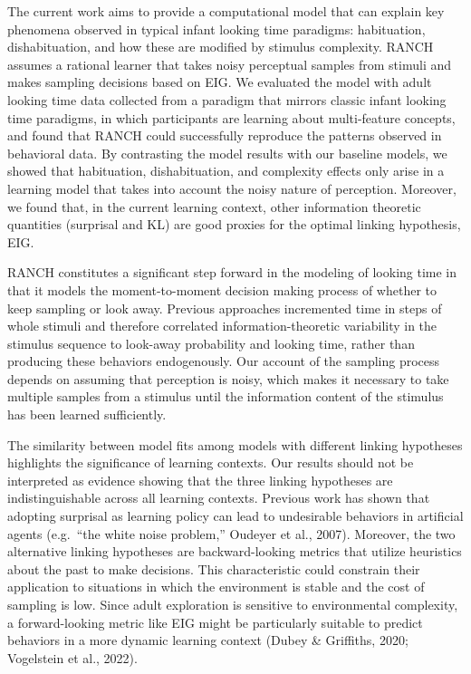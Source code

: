 \documentclass[10pt, letterpaper]{article}
\begin{document}
The current work aims to provide a computational model that can explain
key phenomena observed in typical infant looking time paradigms:
habituation, dishabituation, and how these are modified by stimulus
complexity. RANCH assumes a rational learner that takes noisy perceptual
samples from stimuli and makes sampling decisions based on EIG. We
evaluated the model with adult looking time data collected from a
paradigm that mirrors classic infant looking time paradigms, in which
participants are learning about multi-feature concepts, and found that
RANCH could successfully reproduce the patterns observed in behavioral
data. By contrasting the model results with our baseline models, we
showed that habituation, dishabituation, and complexity effects only
arise in a learning model that takes into account the noisy nature of
perception. Moreover, we found that, in the current learning context,
other information theoretic quantities (surprisal and KL) are good
proxies for the optimal linking hypothesis, EIG.

RANCH constitutes a significant step forward in the modeling of looking
time in that it models the moment-to-moment decision making process of
whether to keep sampling or look away. Previous approaches incremented
time in steps of whole stimuli and therefore correlated
information-theoretic variability in the stimulus sequence to look-away
probability and looking time, rather than producing these behaviors
endogenously. Our account of the sampling process depends on assuming
that perception is noisy, which makes it necessary to take multiple
samples from a stimulus until the information content of the stimulus
has been learned sufficiently.

The similarity between model fits among models with different linking
hypotheses highlights the significance of learning contexts. Our results
should not be interpreted as evidence showing that the three linking
hypotheses are indistinguishable across all learning contexts. Previous
work has shown that adopting surprisal as learning policy can lead to
undesirable behaviors in artificial agents (e.g.~{``the white noise
problem,''} Oudeyer et al., 2007). Moreover, the two alternative linking
hypotheses are backward-looking metrics that utilize heuristics about
the past to make decisions. This characteristic could constrain their
application to situations in which the environment is stable and the
cost of sampling is low. Since adult exploration is sensitive to
environmental complexity, a forward-looking metric like EIG might be
particularly suitable to predict behaviors in a more dynamic learning
context (Dubey \& Griffiths, 2020; Vogelstein et al., 2022).
\end{document}
